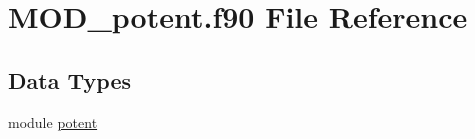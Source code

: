 \hypertarget{MOD__potent_8f90}{\section{M\-O\-D\-\_\-potent.\-f90 File Reference}
\label{MOD__potent_8f90}
}
\subsection*{Data Types}
\begin{DoxyCompactItemize}
\item 
module \hyperlink{classpotent}{potent}
\end{DoxyCompactItemize}
